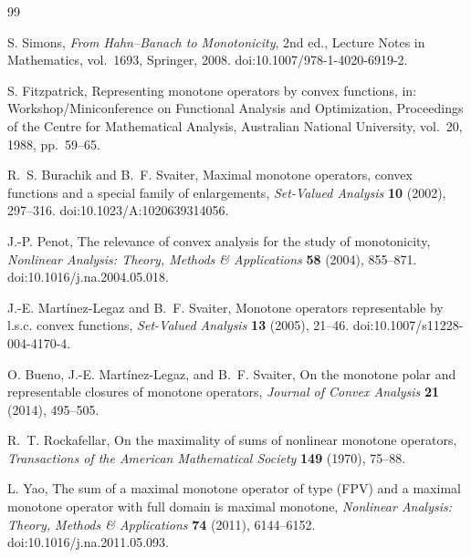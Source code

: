 
\begin{thebibliography}{99}
\raggedright
{}
S. Simons,
\emph{From Hahn--Banach to Monotonicity}, 2nd ed.,
Lecture Notes in Mathematics, vol.~1693, Springer, 2008.
doi:10.1007/978-1-4020-6919-2.

S. Fitzpatrick,
Representing monotone operators by convex functions,
in: Workshop/Miniconference on Functional Analysis and Optimization,
Proceedings of the Centre for Mathematical Analysis, Australian National
University, vol.~20, 1988, pp.~59--65.

R.~S. Burachik and B.~F. Svaiter,
Maximal monotone operators, convex functions and a special family of enlargements,
\emph{Set-Valued Analysis} \textbf{10} (2002), 297--316.
doi:10.1023/A:1020639314056.

J.-P. Penot,
The relevance of convex analysis for the study of monotonicity,
\emph{Nonlinear Analysis: Theory, Methods \& Applications}
\textbf{58} (2004), 855--871.
doi:10.1016/j.na.2004.05.018.

J.-E. Mart\'{i}nez-Legaz and B.~F. Svaiter,
Monotone operators representable by l.s.c. convex functions,
\emph{Set-Valued Analysis} \textbf{13} (2005), 21--46.
doi:10.1007/s11228-004-4170-4.

O. Bueno, J.-E. Mart\'{i}nez-Legaz, and B.~F. Svaiter,
On the monotone polar and representable closures of monotone operators,
\emph{Journal of Convex Analysis} \textbf{21} (2014), 495--505.

R.~T. Rockafellar,
On the maximality of sums of nonlinear monotone operators,
\emph{Transactions of the American Mathematical Society}
\textbf{149} (1970), 75--88.

L. Yao,
The sum of a maximal monotone operator of type (FPV) and a maximal
monotone operator with full domain is maximal monotone,
\emph{Nonlinear Analysis: Theory, Methods \& Applications}
\textbf{74} (2011), 6144--6152.
doi:10.1016/j.na.2011.05.093.


\end{thebibliography}
